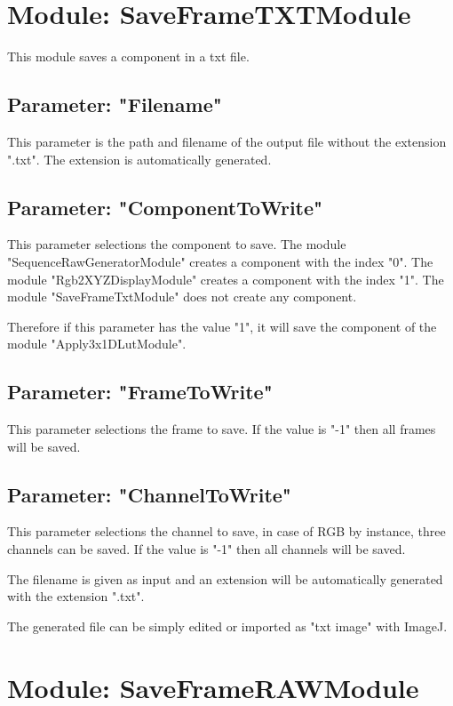 \section{Module: SaveFrameTXTModule}

This module saves a component in a txt file.

\subsection{Parameter: "Filename"}

This parameter is the path and filename of the output file without the extension ".txt". The extension is automatically generated.

\subsection{Parameter: "ComponentToWrite"}

This parameter selections the component to save. The module "SequenceRawGeneratorModule" creates a component with the index "0". The module "Rgb2XYZDisplayModule" creates a component with the index "1". The module "SaveFrameTxtModule" does not create any component.

Therefore if this parameter has the value "1", it will save the component of the module "Apply3x1DLutModule".

\subsection{Parameter: "FrameToWrite"}
This parameter selections the frame to save. If the value is "-1" then all frames will be saved.

\subsection{Parameter: "ChannelToWrite"}

This parameter selections the channel to save, in case of RGB by instance, three channels can be saved. If the value is "-1" then all channels will be saved.

The filename is given as input and an extension will be automatically generated with the extension ".txt".

The generated file can be simply edited or imported as "txt image" with ImageJ. 

\section{Module: SaveFrameRAWModule}

